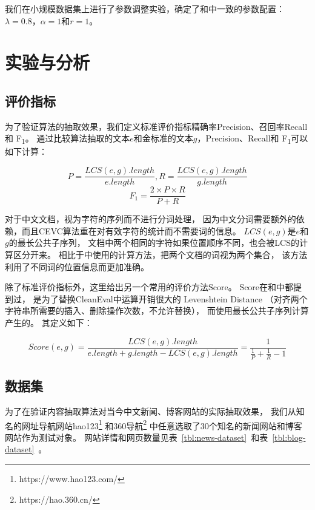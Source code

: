 我们在小规模数据集上进行了参数调整实验，确定了和\cite{wu2013web}中一致的参数配置：
$\lambda=0.8$，$\alpha=1$和$r=1$。

\section{实验与分析}
\label{sec:cevc-experiment}

\subsection{评价指标}
为了验证算法的抽取效果，我们定义标准评价指标精确率Precision、召回率Recall和
F\textsubscript{1}。
通过比较算法抽取的文本$e$和金标准的文本$g$，Precision、Recall和
F\textsubscript{1}可以如下计算：

\begin{equation}
P = \frac{LCS(e,g).length}{e.length}, R = \frac{LCS(e,g).length}{g.length}
\end{equation}
\begin{equation}
F_1 = \frac{2 \times P \times R}{P + R}
\end{equation}

对于中文文档，视为字符的序列而不进行分词处理，
因为中文分词需要额外的依赖，而且CEVC算法重在对有效字符的统计而不需要词的信息。
$LCS(e,g)$是$e$和$g$的最长公共子序列，
文档中两个相同的字符如果位置顺序不同，也会被LCS的计算区分开来。
相比于\cite{weninger2010cetr}中使用的计算方法，把两个文档的词视为两个集合，
该方法利用了不同词的位置信息而更加准确。

除了标准评价指标外，这里给出另一个常用的评价方法Score。
Score在\cite{sun2011dom}和\cite{wu2013web}中都提到过，
是为了替换CleanEval中运算开销很大的
Levenshtein Distance
（对齐两个字符串所需要的插入、删除操作次数，不允许替换），
而使用最长公共子序列计算产生的。
其定义如下：

\begin{equation}
Score(e,g) = \frac{LCS(e,g).length}{e.length + g.length - LCS(e,g).length}
= \frac{1}{\frac{1}{P} + \frac{1}{R} - 1}
\end{equation}

\subsection{数据集}

为了在验证内容抽取算法对当今中文新闻、博客网站的实际抽取效果，
我们从知名的网址导航网站hao123\footnote{https://www.hao123.com/}
和360导航\footnote{https://hao.360.cn/}
中任意选取了30个知名的新闻网站和博客网站作为测试对象。
网站详情和网页数量见表~\ref{tbl:news-dataset}~和表~\ref{tbl:blog-dataset}~。

